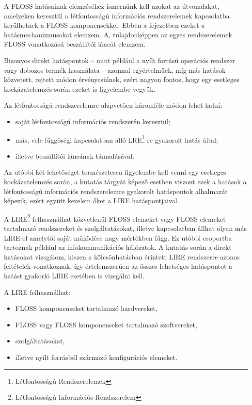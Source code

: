 \documentclass[12pt,magyar,a4paper,oneside]{scrreprt}
\providecommand{\tightlist}{%
  \setlength{\itemsep}{0pt}\setlength{\parskip}{0pt}}
\begin{document}
A FLOSS hatásainak elemzéséhez ismernünk kell azokat az útvonalakat,
amelyeken keresztül a létfontosságú információs rendszerelemek
kapcsolatba kerülhetnek a FLOSS komponensekkel. Ebben a fejezetben
ezeket a hatásmechanizmusokat elemzem. A, tulajdonképpen az egyes
rendszerelemek FLOSS vonatkozású beszállítói láncát elemzem.

Bizonyos direkt hatáspontok -- mint például a nyílt forrású operációs
rendszer vagy dobozos termék használata -- azonnal egyértelműek, míg más
hatások közvetett, rejtett módon érvényesülnek, ezért nagyon fontos,
hogy egy esetleges kockázatelemzés során ezeket is figyelembe vegyük.

Az létfontosságú rendszerelemre alapvetően háromféle módon lehet hatni:

\begin{itemize}
\tightlist
\item
  saját létfontosságú információs rendszerén keresztül;
\item
  más, vele függőségi kapcsolatban álló LRE\footnote{Létfontosságú
    Rendszerelemek}-re gyakorolt hatás által;
\item
  illetve beszállítói láncának támadásával.
\end{itemize}

Az utóbbi két lehetőséget természetesen figyelembe kell venni egy
esetleges kockázatelemzés során, a kutatás tárgyát képező esetben
viszont ezek a hatások a létfontosságú információs rendszerelemre
gyakorolt hatáspontok alhalmazát képezik, ezért együtt kezelem őket a
LIRE hatáspontjaival.

A LIRE\footnote{Létfontosságú Információs Rendszerelem} felhasználhat
közvetlenül FLOSS elemeket vagy FLOSS elemeket tartalmazó rendszereket
és szolgáltatásokat, illetve kapcsolatban állhat olyan más LIRE-el
amelytől saját működése nagy mértékben függ. Ez utóbbi csoportba
tartoznak például az infokommunikációs hálózatok. A kutatás során a
direkt hatásokat vizsgálom, hiszen a kölcsönhatásban érintett LIRE
rendszerre azonos feltételek vonatkoznak, így értelemszerűen az összes
lehetséges hatáspontot a hatást gyakorló LIRE esetében is vizsgálni
kell.

A LIRE felhasználhat:

\begin{itemize}
\tightlist
\item
  FLOSS komponenseket tartalmazó hardvereket,
\item
  FLOSS vagy FLOSS komponenseket tartalmazó szoftvereket,
\item
  szolgáltatásokat,
\item
  illetve nyílt forrásból származó konfigurációs elemeket.
\end{itemize}
\end{document}
